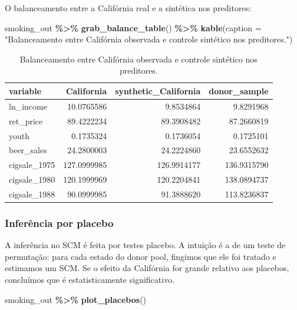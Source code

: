 \documentclass[
]{article}
\newenvironment{Shaded}{\begin{snugshade}}{\end{snugshade}}
\newcommand{\AttributeTok}[1]{\textcolor[rgb]{0.13,0.29,0.53}{#1}}
\newcommand{\FunctionTok}[1]{\textcolor[rgb]{0.13,0.29,0.53}{\textbf{#1}}}
\newcommand{\NormalTok}[1]{#1}
\newcommand{\SpecialCharTok}[1]{\textcolor[rgb]{0.81,0.36,0.00}{\textbf{#1}}}
\newcommand{\StringTok}[1]{\textcolor[rgb]{0.31,0.60,0.02}{#1}}
\begin{document}
O balanceamento entre a Califórnia real e a sintética nos preditores:

\begin{Shaded}
\begin{Highlighting}[]
\NormalTok{smoking\_out }\SpecialCharTok{\%\textgreater{}\%}
  \FunctionTok{grab\_balance\_table}\NormalTok{() }\SpecialCharTok{\%\textgreater{}\%}
  \FunctionTok{kable}\NormalTok{(}\AttributeTok{caption =} \StringTok{"Balanceamento entre Califórnia observada e controle sintético nos preditores."}\NormalTok{)}
\end{Highlighting}
\end{Shaded}

\begin{table}

\caption{\label{tab:cigarro-tidysynth-balanceamento}Balanceamento entre Califórnia observada e controle sintético nos preditores.}
\centering
\begin{tabular}[t]{l|r|r|r}
\hline
variable & California & synthetic\_California & donor\_sample\\
\hline
ln\_income & 10.0765586 & 9.8534864 & 9.8291968\\
\hline
ret\_price & 89.4222234 & 89.3908482 & 87.2660819\\
\hline
youth & 0.1735324 & 0.1736054 & 0.1725101\\
\hline
beer\_sales & 24.2800003 & 24.2224860 & 23.6552632\\
\hline
cigsale\_1975 & 127.0999985 & 126.9914177 & 136.9315790\\
\hline
cigsale\_1980 & 120.1999969 & 120.2204841 & 138.0894737\\
\hline
cigsale\_1988 & 90.0999985 & 91.3888620 & 113.8236837\\
\hline
\end{tabular}
\end{table}

\subsubsection{Inferência por placebo}\label{inferuxeancia-por-placebo}

A inferência no SCM é feita por testes placebo. A intuição é a de um teste de permutação: para cada estado do donor pool, fingimos que ele foi tratado e estimamos um SCM. Se o efeito da Califórnia for grande relativo aos placebos, concluímos que é estatisticamente significativo.

\begin{Shaded}
\begin{Highlighting}[]
\NormalTok{smoking\_out }\SpecialCharTok{\%\textgreater{}\%} \FunctionTok{plot\_placebos}\NormalTok{()}
\end{Highlighting}
\end{Shaded}
\end{document}
